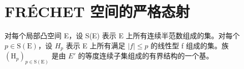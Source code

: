 \section{FRÉCHET 空间的严格态射}

对每个局部凸空间 E，设 S(E) 表示 E 上所有连续半范数组成的集。对每个 \(p \in \mathrm{S}(\mathrm{E})\)，设 \(H_{p}\) 表示 E 上所有满足 \(|f| \leqslant p\) 的线性型 f 组成的集。族 \((\mathrm{H}_{p})_{p \in \mathrm{S}(\mathrm{E})}\) 是由 \(E'\) 的等度连续子集组成的有界结构的一个基。

